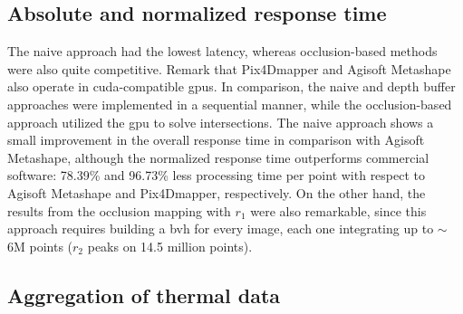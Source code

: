 \subsection{Absolute and normalized response time}

The naive approach had the lowest latency, whereas occlusion-based methods were also quite competitive. Remark that Pix4Dmapper and Agisoft Metashape also operate in \acrshort{cuda}-compatible \acrshort{gpu}s. In comparison, the naive and depth buffer approaches were implemented in a sequential manner, while the occlusion-based approach utilized the \acrshort{gpu} to solve intersections. The naive approach shows a small improvement in the overall response time in comparison with Agisoft Metashape, although the normalized response time outperforms commercial software: 78.39\% and 96.73\% less processing time per point with respect to Agisoft Metashape and Pix4Dmapper, respectively. On the other hand, the results from the occlusion mapping with $r_1$ were also remarkable, since this approach requires building a \acrshort{bvh} for every image, each one integrating up to $\sim$6M points ($r_2$ peaks on 14.5 million points). 

\subsection{Aggregation of thermal data}

